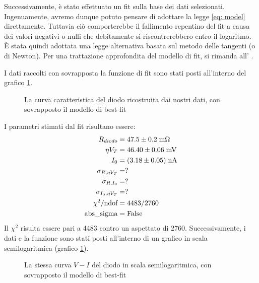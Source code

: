 \documentclass{article}[a4paper, oneside, 11pt]
\begin{document}
Successivamente, è stato effettuato un fit sulla base dei dati selezionati.
Ingenuamente, avremo dunque potuto pensare di adottare la legge 
\eqref{eq: model} direttamente. Tuttavia ciò comporterebbe il fallimento
repentino del fit a causa dei valori negativi o nulli che debitamente si
riscontrerebbero entro il logaritmo. \`E stata quindi adottata una legge
alternativa basata sul metodo delle tangenti (o di Newton). Per una
trattazione approfondita del modello di fit, si rimanda all' .

I dati raccolti con sovrapposta la funzione di fit sono stati posti all'interno 
del grafico \ref{fig: sck_lin}.
\begin{figure}[!htb]
	\centering 
	\caption{La curva caratteristica del diodo ricostruita dai nostri
	dati, con sovrapposto il modello di best-fit \label{fig: sck_lin}}
\end{figure}
I parametri stimati dal fit risultano essere:
\begin{align*}
	R_{diodo} &= 47.5 \pm 0.2 \; \rm m\Omega \\
	\eta V_T &= 46.40 \pm 0.06 \; \rm mV \\
	I_0 &= (3.18 \pm 0.05) \; \rm nA \\
	\sigma_{R, \eta V_T} &= ? \\   
	\sigma_{R, I_0} &= ? \\
	\sigma_{I_0, \eta V_T} &= ? \\
	\chi^2/\text{ndof} &= 4483/2760 \\
	\text{abs\_sigma} &= \rm False
\end{align*}
Il $\chi^2$ risulta essere pari a 4483 contro un aspettato di 2760.
Successivamente, i dati e la funzione sono stati posti all'interno di un
grafico in scala semilogaritmica (grafico \ref{fig: sck_lin}).
\begin{figure}[!htb]
	\centering 
	\caption{La stessa curva $V-I$ del diodo in scala semilogaritmica,
	con sovrapposto il modello di best-fit \label{fig: sck_log}}
\end{figure}

\end{document}
